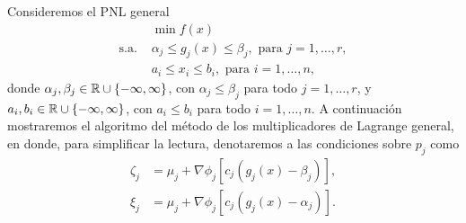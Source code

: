Consideremos el PNL general
\begin{align*}
					& \min f(x) \\
	\text{s.a. }	& \alpha_{j} \leq g_{j}(x) \leq \beta_{j}, \text{ para } j = 1, \dotsc, r, \\
					& a_{i} \leq x_{i} \leq b_{i}, \text{ para } i = 1, \dotsc, n,
\end{align*}
donde \(\alpha_{j}, \beta_{j} \in \mathbb{R} \cup \{-\infty, \infty\}\), con \(\alpha_{j} \leq \beta_{j}\) para todo \(j = 1, \dotsc, r\), y \(a_{i}, b_{i} \in \mathbb{R} \cup \{-\infty, \infty\}\), con \(a_{i} \leq b_{i}\) para todo \(i = 1, \dotsc, n\). A continuación mostraremos el algoritmo del método de los multiplicadores de Lagrange general, en donde, para simplificar la lectura, denotaremos a las condiciones sobre \(p_j\) como
\begin{align*}
	\zeta_j	&= \mu_{j} + \nabla \phi_{j}[c_{j}(g_{j}(x) - \beta_{j})],\\
	\xi_j	&= \mu_{j} + \nabla \phi_{j}[c_{j}(g_{j}(x) - \alpha_{j})].
\end{align*}

